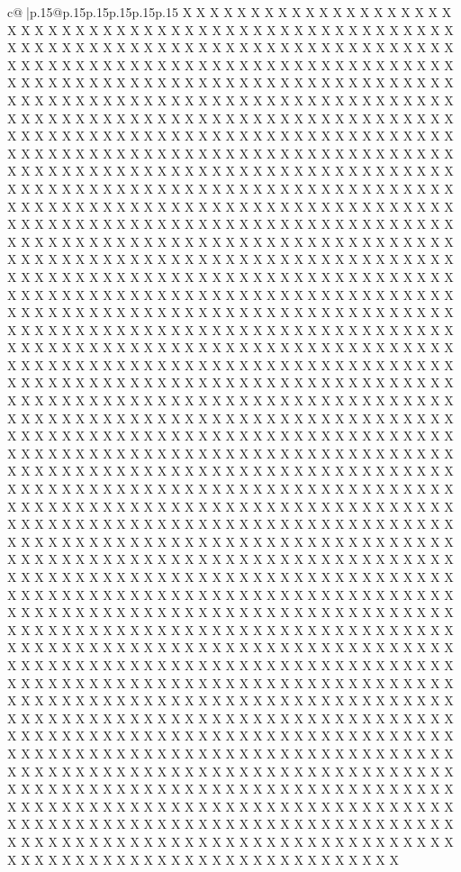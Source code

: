\documentclass{article}
\begin{document}
{\begin{supertabular}{c@{$\;$}|p{.15\linewidth}@{}p{.15\linewidth}p{.15\linewidth}p{.15\linewidth}p{.15\linewidth}p{.15\linewidth}}
{{{X X X X X X X X X X X X X X X X X X X X X X X X X X X X X X X X X X X X X X X X X X X X X X X X X X X X X X X X X X X X X X X X X X X X X X X X X X X X X X X X X X X X X X X X X X X X X X X X X X X X X X X X X X X X X X X X X X X X X X X X X X X X X X X X X X X X X X X X X X X X X X X X X X X X X X X X X X X X X X X X X X X X X X X X X X X X X X X X X X X X X X X X X X X X X X X X X X X X X X X X X X X X X X X X X X X X X X X X X X X X X X X X X X X X X X X X X X X X X X X X X X X X X X X X X X X X X X X X X X X X X X X X X X X X X X X X X X X X X X X X X X X X X X X X X X X X X X X X X X X X X X X X X X X X X X X X X X X X X X X X X X X X X X X X X X X X X X X X X X X X X X X X X X X X X X X X X X X X X X X X X X X X X X X X X X X X X X X X X X X X X X X X X X X X X X X X X X X X X X X X X X X X X X X X X X X X X X X X X X X X X X X X X X X X X X X X X X X X X X X X X X X X X X X X X X X X X X X X X X X X X X X X X X X X X X X X X X X X X X X X X X X X X X X X X X X X X X X X X X X X X X X X X X X X X X X X X X X X X X X X X X X X X X X X X X X X X X X X X X X X X X X X X X X X X X X X X X X X X X X X X X X X X X X X X X X X X X X X X X X X X X X X X X X X X X X X X X X X X X X X X X X X X X X X X X X X X X X X X X X X X X X X X X X X X X X X X X X X X X X X X X X X X X X X X X X X X X X X X X X X X X X X X X X X X X X X X X X X X X X X X X X X X X X X X X X X X X X X X X X X X X X X X X X X X X X X X X X X X X X X X X X X X X X X X X X X X X X X X X X X X X X X X X X X X X X X X X X X X X X X X X X X X X X X X X X X X X X X X X X X X X X X X X X X X X X X X X X X X X X X X X X X X X X X X X X X X X X X X X X X X X X X X X X X X X X X X X X X X X X X X X X X X X X X X X X X X X X X X X X X X X X X X X X X X X X X X X X X X X X X X X X X X X X X X X X X X X X X X X X X X X X X X X X X X X X X X X X X X X X X X X X X X X X X X X X X X X X X X X X X X X X X X X X X X X X X X X X X X X X X X X X X X X X X X X X X X X X X X X X X X X X X X X X X X X X X X X X X X X X X X X X X X X X X X X X X X X X X X X X X X X X X X X X X X X X X X X X X X X X X X X X X X X X X X X X X X X X X X X X X X X X X X X X X X X X X X X X X X X X X X X X X X X X X X X X X X X X X X X X X X X X X X X X X X X X X X X X X X X X X X X X X X X X X X X X X X X X X X X X X X X X X X X X X X X X X X X X X X X X X X X X X X X X X X X X X X X X X X X X X X X X X X X X X X X X X X X X X X X X X X X X X X X X X X X X X X X X X X X X X X X X X X X X X X X X X X X X X X X X X X X X X X X X X X X X X X X X X X X X X X X X X X X X X X X X X X X X X X X X X X X X X X X X X X X X X X X X X X X X X X X X X X X X X X X X X X X X X X X X X X X X X X X X X X X X X X X X X X X X X X X X X X X X X X X X X X X X X X X X X X X X X X X X X X X X X X X X X X X X X X X X X X X X X X X X X X X X X X X X X X X X X X X X X X X X X X X X X X X X X X X X X X X X X X X X X X X X X X X X X X X X X X X X X X X X X X X X X X X X X X X X X X X X X X X X X X X X X X X X X X X X X X X X X X X X X X X X X X X X X X X X X X X X X X X X X X X X X X X X X X X X X X X X X X X X X X X X X X X X X X X X X X X X X X X X X X X X X X X X X X X X X X X X X X X X X X X X X X X X X X X X X X X X X X X X X X X X X X X X X }}}
\end{supertabular}}
\end{document}
